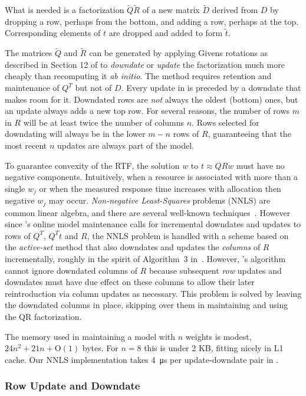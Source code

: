 What is needed is a factorization $\tilde{Q}\tilde{R}$ of a new matrix $\tilde{D}$
derived from $D$ by dropping a row, perhaps from the bottom,
and adding a row, perhaps at the top.
Corresponding elements of $t$ are dropped and added to form $\tilde{t}$.

The matrices $\tilde{Q}$ and $\tilde{R}$ can be generated by applying Givens rotations
as described in Section 12 of \cite{GoVL} to \emph{downdate} or \emph{update} the factorization
much more cheaply than recomputing it \emph{ab initio}.
The method requires retention and maintenance of $Q^T$ but not of $D$.
Every update in \pacora is preceded by a downdate that makes room for it.
Downdated rows are \emph{not} always the oldest (bottom) ones, but
an update always adds a new top row.
For several reasons, the number of rows $m$ in $R$
will be at least twice the number of columns $n$.
Rows selected for downdating will always be in the lower $m - n$ rows of $R$,
guaranteeing that the most recent $n$ updates are always part of the model.


To guarantee convexity of the RTF, the solution $w$ to $t \approx QRw$ must have no negative components.
Intuitively, when a resource is associated with more than a single $w_j$
or when the measured response time increases with allocation then negative $w_j$ may occur. \emph{Non-negative Least-Squares} problems (NNLS) are common linear algebra, and there are several well-known techniques~\cite{ChPl}.
However since \pacora's online model maintenance calls for
incremental downdates and updates to rows of $Q^T$, $Q^Tt$ and $R$,
the NNLS problem is handled with a scheme
based on the \emph{active-set} method\cite{LaHa} that
also downdates and updates the \emph{columns} of $R$ incrementally,
roughly in the spirit of Algorithm~3 in~\cite{LuDu}.
However, \pacora's algorithm cannot ignore downdated columns of $R$
because subsequent \emph{row} updates and downdates must have due effect
on these columns to allow their later reintroduction via column updates as necessary.
This problem is solved by leaving the downdated columns in place,
skipping over them in maintaining and using the QR factorization.

The memory used in maintaining a model with $n$ weights is modest, $24n^2 + 21n + \textrm{O}(1)$ bytes.
For $n = 8$ this is under 2 KB, fitting nicely in L1 cache.
Our NNLS implementation takes \SI{4}{\micro\second} per update-downdate pair in \tess.


\subsubsection{Row Update and Downdate}

